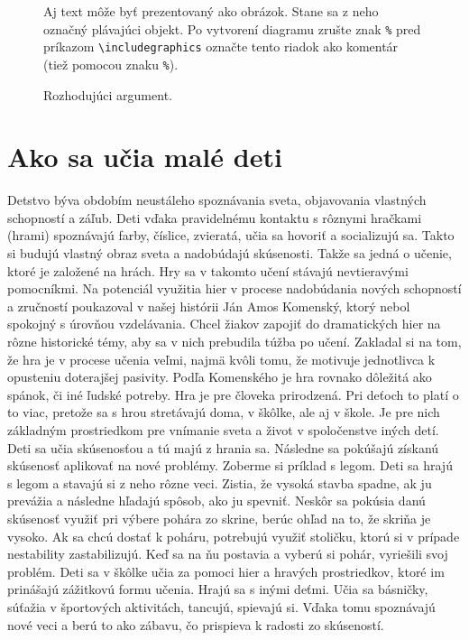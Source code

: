 \documentclass[10pt,twoside,slovak,a4paper]{article}
\begin{document}
\begin{figure*}[tbh]
\centering
Aj text môže byť prezentovaný ako obrázok. Stane sa z neho označný plávajúci objekt. Po vytvorení diagramu zrušte znak \texttt{\%} pred príkazom \verb|\includegraphics| označte tento riadok ako komentár (tiež pomocou znaku \texttt{\%}).
\caption{Rozhodujúci argument.}
\label{f:rozhod}
\end{figure*}


\section{Ako sa učia malé deti} \label{predskolaci}
	Detstvo býva obdobím neustáleho spoznávania sveta, objavovania vlastných schopností a záľub. Deti vďaka pravidelnému kontaktu s rôznymi hračkami (hrami) spoznávajú farby, číslice, zvieratá, učia sa hovoriť a socializujú sa. Takto si budujú vlastný obraz sveta a nadobúdajú skúsenosti. Takže sa jedná o učenie, ktoré je založené na hrách. Hry sa v takomto učení stávajú nevtieravými  pomocníkmi. Na potenciál využitia hier v procese nadobúdania nových schopností a zručností poukazoval v našej histórii Ján Amos Komenský, ktorý nebol spokojný s úrovňou vzdelávania. Chcel žiakov zapojiť do dramatických hier na rôzne historické témy, aby sa v nich prebudila túžba po učení. Zakladal si na tom, že hra je v procese učenia veľmi, najmä kvôli tomu, že motivuje jednotlivca k opusteniu doterajšej pasivity. Podľa Komenského je hra rovnako dôležitá ako spánok, či iné ľudské potreby. Hra je pre človeka prirodzená. Pri deťoch to platí o to viac, pretože sa s hrou stretávajú doma, v škôlke, ale aj v škole. Je pre nich základným prostriedkom pre vnímanie sveta a život v spoločenstve iných detí. Deti sa učia skúsenosťou a tú majú z hrania sa. Následne sa pokúšajú získanú skúsenosť aplikovať na nové problémy. Zoberme si príklad s legom. Deti sa hrajú s legom a stavajú si z neho rôzne veci. Zistia, že vysoká stavba spadne, ak ju prevážia a následne hľadajú spôsob, ako ju spevniť. Neskôr sa pokúsia danú skúsenosť využiť pri výbere pohára zo skrine, berúc ohľad na to, že skriňa je vysoko. Ak sa chcú dostať k poháru, potrebujú využiť stoličku, ktorú si v prípade nestability zastabilizujú. Keď sa na ňu postavia a vyberú si pohár, vyriešili svoj problém.  Deti sa v škôlke učia za pomoci hier a hravých prostriedkov, ktoré im prinášajú zážitkovú formu učenia. Hrajú sa s inými deťmi. Učia sa básničky, súťažia v športových aktivitách, tancujú,  spievajú si. Vďaka tomu spoznávajú nové veci a berú to ako zábavu, čo prispieva k radosti zo skúseností. 
\end{document}
